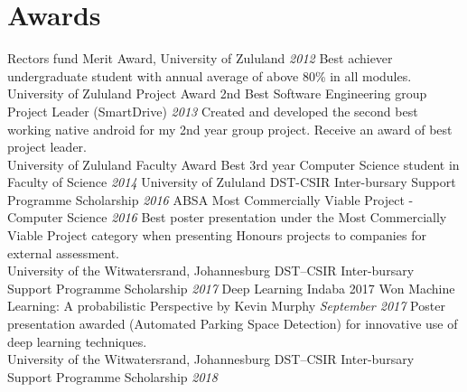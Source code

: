 \documentclass[letterpaper]{moderncv}        %
\begin{document}
				\section{Awards}
				\cventry
				{Rector\textquotesingle{}s fund}
				{Merit Award, University of Zululand}
				{}
				{\textit{2012}}
				{}
				{Best achiever undergraduate student with annual average of above 80\% in all modules.\\University of Zululand}
				\vspace{1mm}
				\cventry
				{Project Award}
				{2nd Best Software Engineering group Project Leader (SmartDrive)}
				{}
				{\textit{2013}}
				{}
				{Created and developed the second best working native android for my 2nd year group project. Receive an award of best project leader.\\University of Zululand}
				\vspace{1mm}
				\cventry
				{Faculty Award}
				{Best 3rd year Computer Science student in Faculty of Science}
				{}
				{\textit{2014}}
				{}
				{University of Zululand}
				\vspace{1mm}
				\cventry
				{DST-CSIR}
				{Inter-bursary Support Programme Scholarship}
				{}
				{\textit{2016}}
				{}
				{}
				\vspace{1mm}
				\cventry
				{ABSA}
				{Most Commercially Viable Project - Computer Science}
				{}
				{\textit{2016}}
				{}
				{Best poster presentation under the Most Commercially Viable Project category when presenting Honours projects to companies for external assessment.\\University of the Witwatersrand, Johannesburg}
				\vspace{1mm}
				\cventry
				{DST–CSIR}
				{Inter-bursary Support Programme Scholarship}
				{}
				{\textit{2017}}
				{}
				{}
				\vspace{1mm}
				\cventry
				{Deep Learning Indaba 2017}
				{Won \textquotesingle{}Machine Learning: A probabilistic Perspective by Kevin Murphy\textquotesingle{}}
				{}
				{\textit{September 2017}}
				{}
				{Poster presentation awarded (Automated Parking Space Detection) for innovative use of deep learning techniques.\\University of the Witwatersrand, Johannesburg}
				\vspace{1mm}
				\cventry
				{DST–CSIR}
				{Inter-bursary Support Programme Scholarship}
				{}
				{\textit{2018}}
				{}
				{}
				\vspace{1mm}

\end{document}
